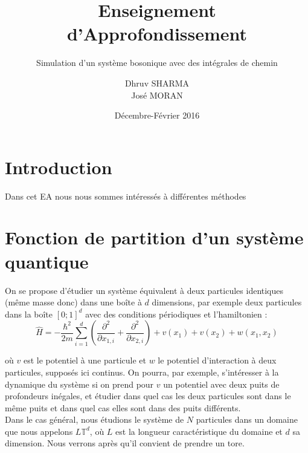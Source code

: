 \documentclass[11pt]{article}
\title{Enseignement d'Approfondissement}
\date{Décembre-Février 2016}
\author{Dhruv SHARMA \\ José MORAN}
\subtitle{Simulation d'un système bosonique avec des intégrales de chemin}
\theoremstyle{definition}
\theoremstyle{remark}
\newcommand{\hham}{\hat{H}}
\newcommand{\dom}{L\mathbb{T}^d}
\begin{document}
\maketitle
\newpage
\tableofcontents
\newpage
\section*{Introduction}
Dans cet EA nous nous sommes intéressés à différentes méthodes 


\newpage
\section{Fonction de partition d'un système quantique}\label{sec:part}
On se propose d'étudier un système équivalent à deux particules identiques (même masse donc) dans une boîte à $d$ dimensions, par exemple deux particules dans la boîte $[0;1]^d$ avec des conditions périodiques et l'hamiltonien :
\begin{equation}
\hham = -\frac{\hbar^2}{2m}\sum_{i=1}^{d}\left( \frac{\partial^2}{\partial x_{1,i}}+\frac{\partial^2}{\partial x_{2,i}}\right)+v(x_1)+v(x_2)+w(x_1,x_2)
\end{equation}

où $v$ est le potentiel à une particule et $w$ le potentiel d'interaction à deux particules, supposés ici continus. On pourra, par exemple, s'intéresser à la dynamique du système si on prend pour $v$ un potentiel avec deux puits de profondeurs inégales, et étudier dans quel cas les deux particules sont dans le même puits et dans quel cas elles sont dans des puits différents.
\\

Dans le cas général, nous étudions le système de $N$ particules dans un domaine que nous appelons $\dom$, où $L$ est la longueur caractéristique du domaine et $d$ sa dimension. Nous verrons après qu'il convient de prendre un tore.
\\
\end{document}
